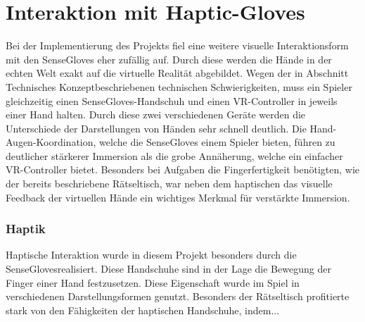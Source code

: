 \section{Interaktion mit Haptic-Gloves}
Bei der Implementierung des Projekts fiel eine weitere visuelle Interaktionsform mit den SenseGloves eher zufällig auf. Durch diese werden die Hände in der echten Welt exakt auf die virtuelle Realität abgebildet. Wegen der in Abschnitt \dq Technisches Konzept\dq beschriebenen technischen Schwierigkeiten, muss ein Spieler gleichzeitig einen SenseGloves-Handschuh und einen VR-Controller in jeweils einer Hand halten. Durch diese zwei verschiedenen Geräte werden die Unterschiede der Darstellungen von Händen sehr schnell deutlich. Die Hand-Augen-Koordination, welche die SenseGloves einem Spieler bieten, führen zu deutlicher stärkerer Immersion als die grobe Annäherung, welche ein einfacher VR-Controller bietet. Besonders bei Aufgaben die Fingerfertigkeit benötigten, wie der bereits beschriebene Rätseltisch, war neben dem haptischen das visuelle Feedback der virtuellen Hände ein wichtiges Merkmal für verstärkte Immersion.
\subsubsection{Haptik}
Haptische Interaktion wurde in diesem Projekt besonders durch die \dq SenseGloves\dq realisiert. Diese Handschuhe sind in der Lage die Bewegung der Finger einer Hand festzusetzen. Diese Eigenschaft wurde im Spiel in verschiedenen Darstellungsformen genutzt. Besonders der Rätseltisch profitierte stark von den Fähigkeiten der haptischen Handschuhe, indem...

